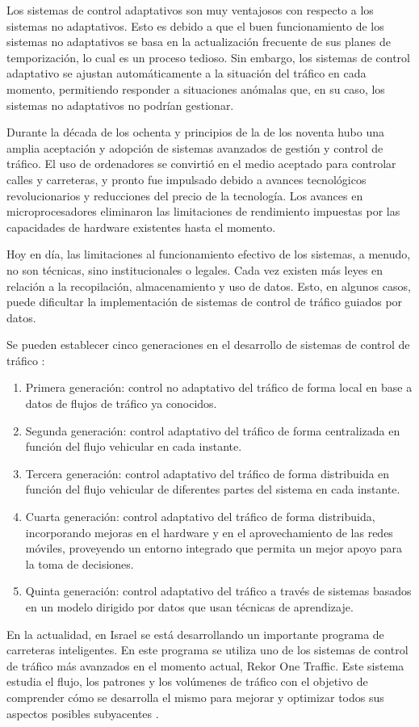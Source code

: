 Los sistemas de control adaptativos son muy ventajosos con respecto a los sistemas no adaptativos. Esto es debido a que el buen funcionamiento de los sistemas no adaptativos se basa en la actualización frecuente de sus planes de temporización, lo cual es un proceso tedioso. Sin embargo, los sistemas de control adaptativo se ajustan automáticamente a la situación del tráfico en cada momento, permitiendo responder a situaciones anómalas que, en su caso, los sistemas no adaptativos no podrían gestionar.  

Durante la década de los ochenta y principios de la de los noventa hubo una amplia aceptación y adopción de sistemas avanzados de gestión y control de tráfico. El uso de ordenadores se convirtió en el medio aceptado para controlar calles y carreteras, y pronto fue impulsado debido a avances tecnológicos revolucionarios y reducciones del precio de la tecnología. Los avances en microprocesadores eliminaron las limitaciones de rendimiento impuestas por las capacidades de hardware existentes hasta el momento. \cite{evolution}

Hoy en día, las limitaciones al funcionamiento efectivo de los sistemas, a menudo, no son técnicas, sino institucionales o legales. Cada vez existen más leyes en relación a la recopilación, almacenamiento y uso de datos. Esto, en algunos casos, puede dificultar la implementación de sistemas de control de tráfico guiados por datos. \cite{evolution}

Se pueden establecer cinco generaciones en el desarrollo de sistemas de control de tráfico \cite{wang2018review}:
\begin{enumerate}
    \item Primera generación: control no adaptativo del tráfico de forma local en base a datos de flujos de tráfico ya conocidos.
    \item Segunda generación: control adaptativo del tráfico de forma centralizada en función del flujo vehicular en cada instante.
    \item Tercera generación: control adaptativo del tráfico de forma distribuida en función del flujo vehicular de diferentes partes del sistema en cada instante.
    \item Cuarta generación: control adaptativo del tráfico de forma distribuida, incorporando mejoras en el hardware y en el aprovechamiento de las redes móviles, proveyendo un entorno integrado que permita un mejor apoyo para la toma de decisiones.
    \item Quinta generación: control adaptativo del tráfico a través de sistemas basados en un modelo dirigido por datos que usan técnicas de aprendizaje.
\end{enumerate}

En la actualidad, en Israel se está desarrollando un importante programa de carreteras inteligentes. En este programa se utiliza uno de los sistemas de control de tráfico más avanzados en el momento actual, Rekor One Traffic. Este sistema estudia el flujo, los patrones y los volúmenes de tráfico con el objetivo de comprender cómo se desarrolla el mismo para mejorar y optimizar todos sus aspectos posibles subyacentes \cite{rekor}.